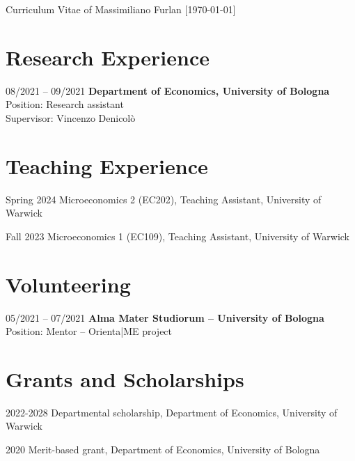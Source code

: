 \documentclass[11pt,a4paper]{article}
\begin{document}
\begin{cv}{\LARGE Curriculum Vitae of Massimiliano Furlan \large{[\mydatestyle\today]}}
\section{Research Experience}

\begin{cvlist}{}
	\item[08/2021 -- 09/2021] \textbf{Department of Economics, University of Bologna}\\
		Position: Research assistant\\
		Supervisor: Vincenzo Denicolò
\end{cvlist}
\vspace{-20pt}

\section{Teaching Experience}

\begin{cvlist}{}
  	\itemsep -4pt
	\item[Spring 2024] Microeconomics 2 (EC202), Teaching Assistant, University of Warwick
	\item[Fall 2023] Microeconomics 1 (EC109), Teaching Assistant, University of Warwick
	\end{cvlist}
\vspace{-20pt}

\section{Volunteering}
\begin{cvlist}{}
	\item[05/2021 -- 07/2021] \textbf{Alma Mater Studiorum – University of Bologna}\\
		Position: Mentor -- Orienta|ME project
\end{cvlist}
\vspace{-20pt}

\section{Grants and Scholarships}
\begin{cvlist}{}
	\itemsep -4pt
	\item[2022-2028] Departmental scholarship, Department of Economics, University of Warwick 
	\item[2020] Merit-based grant, Department of Economics, University of Bologna
\end{cvlist}



\end{cv}
\end{document}
